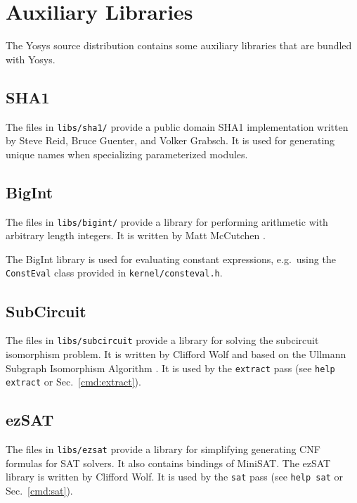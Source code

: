 
\chapter{Auxiliary Libraries}

The Yosys source distribution contains some auxiliary libraries that are bundled
with Yosys.

\section{SHA1}

The files in {\tt libs/sha1/} provide a public domain SHA1 implementation written
by Steve Reid, Bruce Guenter, and Volker Grabsch. It is used for generating
unique names when specializing parameterized modules.

\section{BigInt}

The files in {\tt libs/bigint/} provide a library for performing arithmetic with
arbitrary length integers. It is written by Matt McCutchen .

The BigInt library is used for evaluating constant expressions, e.g.~using the {\tt
ConstEval} class provided in {\tt kernel/consteval.h}.

\section{SubCircuit}
\label{sec:SubCircuit}

The files in {\tt libs/subcircuit} provide a library for solving the subcircuit
isomorphism problem. It is written by Clifford Wolf and based on the Ullmann
Subgraph Isomorphism Algorithm \cite{UllmannSubgraphIsomorphism}. It is used by
the {\tt extract} pass (see {\tt help extract} or Sec.~\ref{cmd:extract}).

\section{ezSAT}

The files in {\tt libs/ezsat} provide a library for simplifying generating CNF
formulas for SAT solvers. It also contains bindings of MiniSAT. The ezSAT
library is written by Clifford Wolf. It is used by the {\tt sat} pass (see
{\tt help sat} or Sec.~\ref{cmd:sat}).

